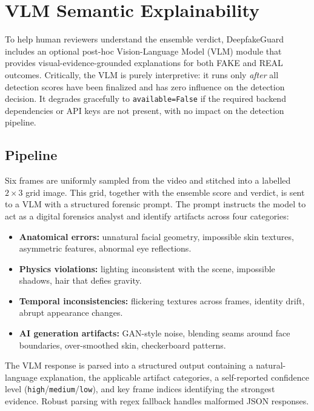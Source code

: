 \documentclass[conference]{IEEEtran}
\begin{document}
\section{VLM Semantic Explainability} \label{sec:vlm}

To help human reviewers understand the ensemble verdict, DeepfakeGuard includes an optional post-hoc Vision-Language Model (VLM) module that provides visual-evidence-grounded explanations for both FAKE and REAL outcomes. Critically, the VLM is purely interpretive: it runs only \emph{after} all detection scores have been finalized and has zero influence on the detection decision. It degrades gracefully to \texttt{available=False} if the required backend dependencies or API keys are not present, with no impact on the detection pipeline.

\subsection{Pipeline}
Six frames are uniformly sampled from the video and stitched into a labelled $2 \times 3$ grid image. This grid, together with the ensemble score and verdict, is sent to a VLM with a structured forensic prompt. The prompt instructs the model to act as a digital forensics analyst and identify artifacts across four categories:
\begin{itemize}[leftmargin=*]
    \item \textbf{Anatomical errors:} unnatural facial geometry, impossible skin textures, asymmetric features, abnormal eye reflections.
    \item \textbf{Physics violations:} lighting inconsistent with the scene, impossible shadows, hair that defies gravity.
    \item \textbf{Temporal inconsistencies:} flickering textures across frames, identity drift, abrupt appearance changes.
    \item \textbf{AI generation artifacts:} GAN-style noise, blending seams around face boundaries, over-smoothed skin, checkerboard patterns.
\end{itemize}

The VLM response is parsed into a structured output containing a natural-language explanation, the applicable artifact categories, a self-reported confidence level (\texttt{high}/\texttt{medium}/\texttt{low}), and key frame indices identifying the strongest evidence. Robust parsing with regex fallback handles malformed JSON responses.
\end{document}
